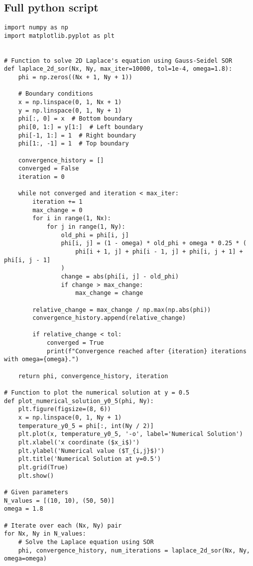 \documentclass[a4paper, twoside]{article}
\begin{document}
\subsection{Full python script}
\begin{lstlisting}
import numpy as np
import matplotlib.pyplot as plt


# Function to solve 2D Laplace's equation using Gauss-Seidel SOR
def laplace_2d_sor(Nx, Ny, max_iter=10000, tol=1e-4, omega=1.8):
    phi = np.zeros((Nx + 1, Ny + 1))
    
    # Boundary conditions
    x = np.linspace(0, 1, Nx + 1)
    y = np.linspace(0, 1, Ny + 1)
    phi[:, 0] = x  # Bottom boundary
    phi[0, 1:] = y[1:]  # Left boundary
    phi[-1, 1:] = 1  # Right boundary
    phi[1:, -1] = 1  # Top boundary
    
    convergence_history = []
    converged = False
    iteration = 0
    
    while not converged and iteration < max_iter:
        iteration += 1
        max_change = 0
        for i in range(1, Nx):
            for j in range(1, Ny):
                old_phi = phi[i, j]
                phi[i, j] = (1 - omega) * old_phi + omega * 0.25 * (
                    phi[i + 1, j] + phi[i - 1, j] + phi[i, j + 1] + phi[i, j - 1]
                )
                change = abs(phi[i, j] - old_phi)
                if change > max_change:
                    max_change = change
        
        relative_change = max_change / np.max(np.abs(phi))
        convergence_history.append(relative_change)
        
        if relative_change < tol:
            converged = True
            print(f"Convergence reached after {iteration} iterations with omega={omega}.")
    
    return phi, convergence_history, iteration

# Function to plot the numerical solution at y = 0.5
def plot_numerical_solution_y0_5(phi, Ny):
    plt.figure(figsize=(8, 6))
    x = np.linspace(0, 1, Ny + 1)
    temperature_y0_5 = phi[:, int(Ny / 2)]
    plt.plot(x, temperature_y0_5, '-o', label='Numerical Solution')
    plt.xlabel('x coordinate ($x_i$)')
    plt.ylabel('Numerical value ($T_{i,j}$)')
    plt.title('Numerical Solution at y=0.5')
    plt.grid(True)
    plt.show()

# Given parameters
N_values = [(10, 10), (50, 50)]
omega = 1.8

# Iterate over each (Nx, Ny) pair
for Nx, Ny in N_values:
    # Solve the Laplace equation using SOR
    phi, convergence_history, num_iterations = laplace_2d_sor(Nx, Ny, omega=omega)


\end{lstlisting}
\end{document}
